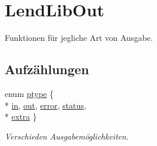 \hypertarget{group___lend_lib_out}{}\section{Lend\+Lib\+Out}
\label{group___lend_lib_out}


Funktionen für jegliche Art von Ausgabe.  


\subsection*{Aufzählungen}
\begin{DoxyCompactItemize}
\item 
enum \hyperlink{group___lend_lib_out_ga0916607956575302a93dbd21440edc1a}{ptype} \{ \\*
\hyperlink{group___lend_lib_out_gga0916607956575302a93dbd21440edc1aa9e70047869d00c5afd8c68af325e48d7}{in}, 
\hyperlink{group___lend_lib_out_gga0916607956575302a93dbd21440edc1aaaca14bf8f96bb2b357f12496b7f11579}{out}, 
\hyperlink{group___lend_lib_out_gga0916607956575302a93dbd21440edc1aad606e435413ea0944dd00d49e901e4ed}{error}, 
\hyperlink{group___lend_lib_out_gga0916607956575302a93dbd21440edc1aa9a6940c3bba41cdd6dacae1a00176a30}{status}, 
\\*
\hyperlink{group___lend_lib_out_gga0916607956575302a93dbd21440edc1aa6884b538ac6996bddc51afddcb815e31}{extra}
 \}\begin{DoxyCompactList}\small\item\em Verschieden Ausgabemöglichkeiten. \end{DoxyCompactList}
\end{DoxyCompactItemize}

